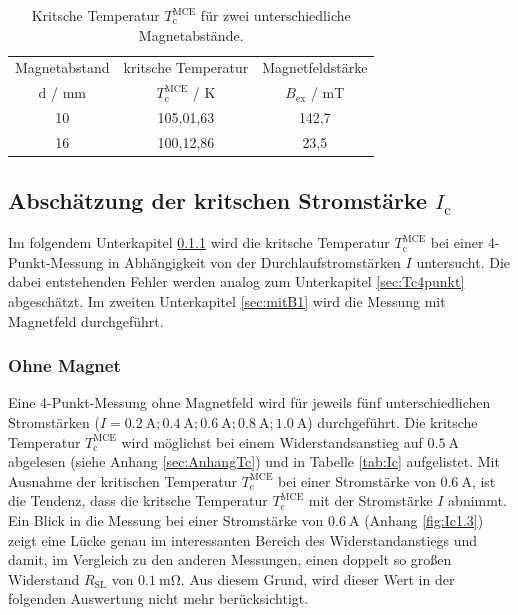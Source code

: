 \begin{table}
  \centering
  \caption{Kritsche Temperatur $T^{\text{MCE}}_{\text{c}}$ für zwei
	unterschiedliche Magnetabstände.}
  \label{tab:Tc4PM1016}
  \begin{tabular}{S | S S}
    \toprule
    {Magnetabstand} & {kritsche Temperatur} & {Magnetfeldstärke} \\
    {d / mm} & {$T^{\text{MCE}}_{\text{c}}$ / K } & {$B_{\text{ex}}$ / mT} \\
    \midrule
    {10} & {105,01,63}	&	{142,7}	\\
		{16} & {100,12,86}	&	{23,5}	\\
    \bottomrule
  \end{tabular}
\end{table}

\subsection{Abschätzung der kritschen Stromstärke $I_{\text{c}}$}
\label{sec:Ic}
Im folgendem Unterkapitel \ref{sec:ohneB1} wird die kritsche Temperatur
$T^{\text{MCE}}_{\text{c}}$ bei einer 4-Punkt-Messung in Abhängigkeit von der
Durchlaufstromstärken $I$ untersucht. Die dabei entstehenden Fehler werden analog
zum Unterkapitel \ref{sec:Tc4punkt} abgeschätzt. Im zweiten Unterkapitel
\ref{sec:mitB1} wird die Messung mit Magnetfeld durchgeführt.

\subsubsection{Ohne Magnet}
\label{sec:ohneB1}
Eine 4-Punkt-Messung ohne Magnetfeld wird für jeweils fünf unterschiedlichen
Stromstärken ($I=\SI{0,2}{\ampere}; \SI{0,4}{\ampere}; \SI{0,6}{\ampere};
\SI{0,8}{\ampere}; \SI{1,0}{\ampere}$) durchgeführt. Die kritsche Temperatur
$T^{\text{MCE}}_{\text{c}}$ wird möglichst bei einem Widerstandsanstieg auf
$\SI{0.5}{\ampere}$ abgelesen (siehe Anhang \ref{sec:AnhangTc}) und
in Tabelle \ref{tab:Ic} aufgelistet. Mit Ausnahme
der kritischen Temperatur $T^{\text{MCE}}_{\text{c}}$ bei einer Stromstärke von
$\SI{0.6}{\ampere}$, ist die Tendenz, dass die kritsche Temperatur
$T^{\text{MCE}}_{\text{c}}$ mit der Stromstärke $I$ abnimmt. Ein Blick in die Messung
bei einer Stromstärke von $\SI{0,6}{\ampere}$ (Anhang \ref{fig:Ic1.3}) zeigt
eine Lücke genau im interessanten Bereich des Widerstandanstiegs
und damit, im Vergleich zu den anderen Messungen, einen doppelt so großen
Widerstand $R_{\text{SL}}$ von $\SI{0.1}{\milli\ohm}$. Aus diesem Grund, wird dieser
Wert in der folgenden Auswertung nicht mehr berücksichtigt.

